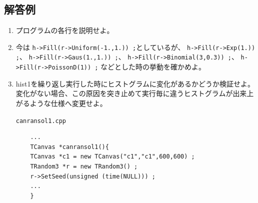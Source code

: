   \subsection{解答例}

  \begin{enumerate}

   \item プログラムの各行を説明せよ。

   \item 今は
	 \verb|h->Fill(r->Uniform(-1.,1.)) ;|としているが、
	 \verb|h->Fill(r->Exp(1.)) ;|、
	 \verb|h->Fill(r->Gaus(1.,1.)) ;|、
	 \verb|h->Fill(r->Binomial(3,0.3)) ;|、
	 \verb|h->Fill(r->PoissonD(1)) ;|
	 などとした時の挙動を確かめよ。

   \item hist1を繰り返し実行した時にヒストグラムに変化があるかどうか検証せよ。
	 変化がない場合、この原因を突き止めて実行毎に違うヒストグラムが出来上がるような仕様へ変更せよ。
	 \begin{itembox}{\texttt{canransol1.cpp}}
\begin{verbatim}
	...
	TCanvas *canransol1(){
	TCanvas *c1 = new TCanvas("c1","c1",600,600) ;
	TRandom3 *r = new TRandom3() ;
	r->SetSeed(unsigned (time(NULL))) ;
	...
	}
\end{verbatim}
	 \end{itembox}

  \end{enumerate}
